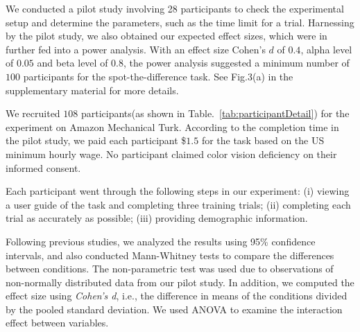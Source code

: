 {\vspace{.3em}
We conducted a pilot study involving 28 participants to check the experimental setup and determine the parameters, such as the time limit for a trial.
Harnessing by the pilot study, we also obtained our expected effect sizes, which were in further fed into a power analysis. With an effect size Cohen's $d$ of $0.4$, alpha level of $0.05$ and beta level of $0.8$, the power analysis suggested a minimum number of $100$ participants for the spot-the-difference task. See Fig.3(a) in the supplementary material for more details.


\vspace{.3em}
We recruited $108$ participants(as shown in Table.~\ref{tab:participantDetail}) for the experiment on Amazon Mechanical Turk.
According to the completion time in the pilot study, we paid each participant \$$1.5$ for the task based on the US minimum hourly wage.
No participant claimed color vision deficiency on their informed consent.

\vspace{.3em}
Each participant went through the following steps in our experiment: (i) viewing a user guide of the task and completing three training trials; (ii) completing each trial as accurately as possible; (iii) providing demographic information.

{}
Following previous studies, we analyzed the results using 95\% confidence intervals, and also conducted Mann-Whitney tests to compare the differences between conditions. The non-parametric test was used due to observations of non-normally distributed data from our pilot study. In addition, we computed the effect size using \emph{Cohen's d}, i.e., the difference in means of the conditions divided by the pooled standard deviation. We used ANOVA to examine the interaction effect between variables.


}
